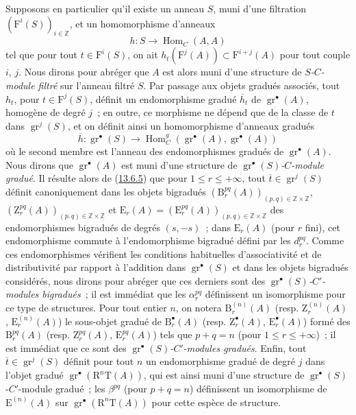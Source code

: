 \begin{env}[13.6.6]
\label{0.13.6.6-fr}
Supposons en particulier qu'il existe un anneau $S$, muni d'une
filtration $(\mathrm F^i(S))_{i\in\mathbb Z}$, et un homomorphisme
d'anneaux
\begin{equation}
\label{0.13.6.6.1-fr}
\tag{13.6.6.1}
h:S\to\operatorname{Hom}_C(A,A)
\end{equation}
tel que pour tout $t\in\mathrm F^i(S)$, on ait
$h_t(\mathrm F^j(A))\subset\mathrm F^{i+j}(A)$ pour tout couple $i$,
$j$. Nous dirons pour abréger que $A$ est alors muni d'une structure de
\emph{$S$-$C$-module filtré} sur l'anneau filtré $S$. Par passage aux
objets gradués associés, tout $h_t$, pour $t\in\mathrm F^j(S)$, définit
un endomorphisme gradué $\overline h_t$ de
$\operatorname{gr}^\bullet(A)$, homogène de degré $j$~; en outre, ce
morphisme ne dépend que de la classe de $t$ dans
$\operatorname{gr}^j(S)$, et on définit ainsi un homomorphisme d'anneaux
gradués
\[
\overline h:\operatorname{gr}^\bullet(S)\to
\operatorname{Hom}_C^g(\operatorname{gr}^\bullet(A),
\operatorname{gr}^\bullet(A))
\]
où le second membre est l'anneau des endomorphismes gradués de
$\operatorname{gr}^\bullet(A)$. Nous dirons que
$\operatorname{gr}^\bullet(A)$ est muni d'une structure de
\emph{$\operatorname{gr}^\bullet(S)$-$C$-module gradué}. Il résulte alors
de (\hyperref[0.13.6.5-fr]{13.6.5}) que pour
$1\leq r\leq+\infty$, tout
$\overline t\in\operatorname{gr}^j(S)$ définit canoniquement dans les
objets bigradués
$(\mathrm B_r^{pq}(A))_{(p,q)\in\mathbb Z\times\mathbb Z}$,
$(\mathrm Z_r^{pq}(A))_{(p,q)\in\mathbb Z\times\mathbb Z}$ et
$\mathrm E_r(A)=(\mathrm E_r^{pq}(A))_{(p,q)\in\mathbb Z\times\mathbb Z}$
des endomorphismes bigradués de degrés $(s,-s)$~; dans
$\mathrm E_r(A)$ (pour $r$ fini), cet endomorphisme commute à
l'endomorphisme bigradué défini par les $d_r^{pq}$. Comme ces
endomorphismes vérifient les conditions habituelles d'associativité et
de distributivité par rapport à l'addition dans
$\operatorname{gr}^\bullet(S)$ et dans les objets bigradués considérés,
nous dirons pour abréger que ces derniers sont des
\emph{$\operatorname{gr}^\bullet(S)$-$C'$-modules bigradués}~; il est
immédiat que les $\alpha_r^{pq}$ définissent un isomorphisme pour ce type
de structures. Pour tout entier $n$, on notera
$\mathrm B_r^{(n)}(A)$ (resp. $\mathrm Z_r^{(n)}(A)$,
$\mathrm E_r^{(n)}(A)$) le sous-objet gradué de
$\mathrm B_r^\bullet(A)$ (resp. $\mathrm Z_r^\bullet(A)$,
$\mathrm E_r^\bullet(A)$) formé des $\mathrm B_r^{pq}(A)$ (resp.
$\mathrm Z_r^{pq}(A)$, $\mathrm E_r^{pq}(A)$) tels que $p+q=n$ (pour
$1\leq r\leq+\infty$)~; il est immédiat que ce sont des
\emph{$\operatorname{gr}^\bullet(S)$-$C'$-modules gradués}. Enfin, tout
$\overline t\in\operatorname{gr}^j(S)$ définit pour tout $n$ un
endomorphisme gradué de degré $j$ dans l'objet gradué
$\operatorname{gr}^\bullet(\mathrm R^n\mathrm T(A))$, qui est ainsi muni
d'une structure de
$\operatorname{gr}^\bullet(S)$-$C'$-module gradué~; les
$\beta^{pq}$ (pour $p+q=n$) définissent un isomorphisme de
$\mathrm E^{(n)}(A)$ sur
$\operatorname{gr}^\bullet(\mathrm R^n\mathrm T(A))$ pour cette espèce
de structure.


\end{env}
